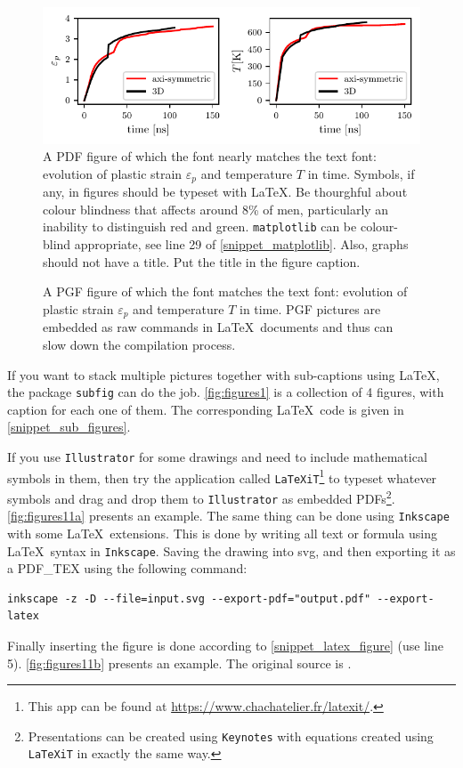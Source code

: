 \documentclass[authoryear,3p,times,preprint,review,fleqn]{elsarticle}
\numberwithin{equation}{section}
\theoremstyle{remark}
\begin{document}
\begin{figure}[!h]
  \centering
  \includegraphics{cold-spray-plots}
  \caption{A PDF figure of which the font nearly matches the text font: 
  evolution of plastic strain $\varepsilon_p$ and temperature $T$ in time. Symbols, if any, in figures should be typeset with \LaTeX.  Be thourghful about colour blindness that affects around 8\% of men, particularly an inability to distinguish red and green. \texttt{matplotlib} can be colour-blind appropriate,  see line 29 of \cref{snippet_matplotlib}. Also, graphs should not have a title. Put the title in the figure caption.}
  \label{fig:cold-spray-plot}
\end{figure}

\begin{figure}[!h]
  \centering
  
  \caption{A PGF figure of which the font matches the text font: 
  evolution of plastic strain $\varepsilon_p$ and temperature  $T$ in time. PGF pictures are embedded as raw commands in \LaTeX\ documents and thus can slow down the compilation process.}
  \label{fig:cold-spray-plot-pgf}
\end{figure}



If you want to stack multiple pictures together with sub-captions using \LaTeX, the package \texttt{subfig} can do the job. \cref{fig:figures1} is a collection of 4 figures, with caption for each one of them. The corresponding \LaTeX\ code is given in \cref{snippet_sub_figures}.

If you use \texttt{Illustrator} for some drawings and need to include mathematical symbols in them, then try the application called \texttt{LaTeXiT}\footnote{This app can be found at \url{https://www.chachatelier.fr/latexit/}.} to typeset whatever symbols and drag and drop them to \texttt{Illustrator} as embedded PDFs\footnote{Presentations can be created using \texttt{Keynotes} with equations created using \texttt{LaTeXiT} in exactly the same way.}.  \cref{fig:figures11a} presents an example. The same thing can be done using \texttt{Inkscape} with some \LaTeX\ extensions. This is done by writing all text or formula using \LaTeX\ syntax in \texttt{Inkscape}. Saving the drawing into svg, and then exporting it as a PDF\_TEX using the following command:
\begin{verbatim}
inkscape -z -D --file=input.svg --export-pdf="output.pdf" --export-latex
\end{verbatim}
Finally inserting the figure is done according to \cref{snippet_latex_figure} (use line 5). \cref{fig:figures11b} presents an example. The original source is \cite{inkscape}.
\end{document}
